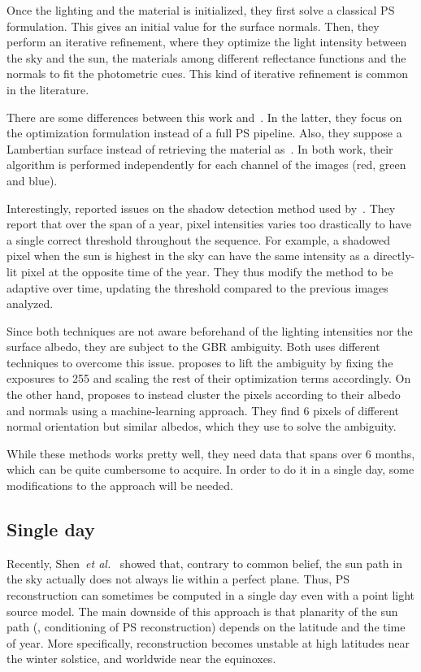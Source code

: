 Once the lighting and the material is initialized, they first solve a classical PS formulation. This gives an initial value for the surface normals. Then, they perform an iterative refinement, where they optimize the light intensity between the sky and the sun, the materials among different reflectance functions and the normals to fit the photometric cues. This kind of iterative refinement is common in the literature.

There are some differences between this work and~\cite{abrams-eccv-12}. In the latter, they focus on the optimization formulation instead of a full PS pipeline. Also, they suppose a Lambertian surface instead of retrieving the material as~\cite{ackermann-cvpr-12}. In both work, their algorithm is performed independently for each channel of the images (red, green and blue).

Interestingly, \cite{abrams-eccv-12} reported issues on the shadow detection method used by~\cite{ackermann-cvpr-12}. They report that over the span of a year, pixel intensities varies too drastically to have a single correct threshold throughout the sequence. For example, a shadowed pixel when the sun is highest in the sky can have the same intensity as a directly-lit pixel at the opposite time of the year. They thus modify the method to be adaptive over time, updating the threshold compared to the previous images analyzed.

Since both techniques are not aware beforehand of the lighting intensities nor the surface albedo, they are subject to the GBR ambiguity. Both uses different techniques to overcome this issue. \cite{abrams-eccv-12} proposes to lift the ambiguity by fixing the exposures to 255 and scaling the rest of their optimization terms accordingly. On the other hand, \cite{ackermann-cvpr-12} proposes to instead cluster the pixels according to their albedo and normals using a machine-learning approach. They find 6 pixels of different normal orientation but similar albedos, which they use to solve the ambiguity.

While these methods works pretty well, they need data that spans over 6 months, which can be quite cumbersome to acquire. In order to do it in a single day, some modifications to the approach will be needed.

\subsection{Single day}
Recently, Shen~{\em et al.}~\cite{shen-pg-14} showed that, contrary to common belief, the sun path in the sky actually does not always lie within a perfect plane. Thus, PS reconstruction can sometimes be computed in a single day even with a point light source model. The main downside of this approach is that planarity of the sun path (\ie, conditioning of PS reconstruction) depends on the latitude and the time of year. More specifically, reconstruction becomes unstable at high latitudes near the winter solstice, and worldwide near the equinoxes.

